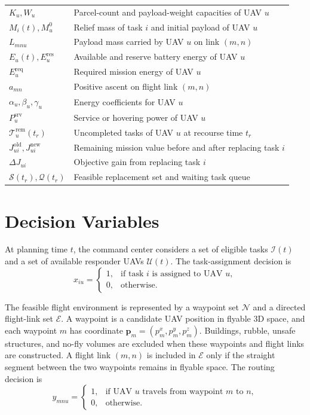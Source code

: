 \begin{longtable}{p{}p{}}
$K_u,W_u$ & Parcel-count and payload-weight capacities of UAV $u$\\
$M_i(t),M_u^0$ & Relief mass of task $i$ and initial payload of UAV $u$\\
$L_{mnu}$ & Payload mass carried by UAV $u$ on link $(m,n)$\\
$E_u(t),E_u^{\mathrm{res}}$ & Available and reserve battery energy of UAV $u$\\
$E_u^{\mathrm{req}}$ & Required mission energy of UAV $u$\\
$a_{mn}$ & Positive ascent on flight link $(m,n)$\\
$\alpha_u,\beta_u,\gamma_u$ & Energy coefficients for UAV $u$\\
$P_u^{\mathrm{srv}}$ & Service or hovering power of UAV $u$\\
$\mathcal{T}_u^{\mathrm{rem}}(t_r)$ & Uncompleted tasks of UAV $u$ at recourse time $t_r$\\
$J_{ui}^{\mathrm{old}},J_{ui}^{\mathrm{new}}$ & Remaining mission value before and after replacing task $i$\\
$\Delta J_{ui}$ & Objective gain from replacing task $i$\\
$\mathcal{S}(t_r),\mathcal{Q}(t_r)$ & Feasible replacement set and waiting task queue\\
\hline
\end{longtable}

\clearpage
\section{Decision Variables}

At planning time $t$, the command center considers a set of eligible tasks
$\mathcal{I}(t)$ and a set of available responder UAVs $\mathcal{U}(t)$. The
task-assignment decision is
\begin{equation}
x_{iu}
=
\begin{cases}
1, & \text{if task }i\text{ is assigned to UAV }u,\\
0, & \text{otherwise}.
\end{cases}
\end{equation}

The feasible flight environment is represented by a waypoint set
$\mathcal{N}$ and a directed flight-link set $\mathcal{E}$. A waypoint is a
candidate UAV position in flyable 3D space, and each waypoint $m$ has
coordinate $\mathbf{p}_m=(p_m^x,p_m^y,p_m^z)$. Buildings, rubble, unsafe
structures, and no-fly volumes are excluded when these waypoints and flight
links are constructed. A flight link $(m,n)$ is included in $\mathcal{E}$ only
if the straight segment between the two waypoints remains in flyable space.
The routing decision is
\begin{equation}
y_{mnu}
=
\begin{cases}
1, & \text{if UAV }u\text{ travels from waypoint }m\text{ to }n,\\
0, & \text{otherwise}.
\end{cases}
\end{equation}

